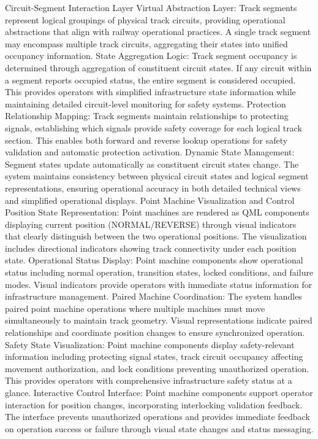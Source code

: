 Circuit-Segment Interaction Layer
Virtual Abstraction Layer: Track segments represent logical groupings of physical track circuits, providing operational abstractions that align with railway operational practices. A single track segment may encompass multiple track circuits, aggregating their states into unified occupancy information.
State Aggregation Logic: Track segment occupancy is determined through aggregation of constituent circuit states. If any circuit within a segment reports occupied status, the entire segment is considered occupied. This provides operators with simplified infrastructure state information while maintaining detailed circuit-level monitoring for safety systems.
Protection Relationship Mapping: Track segments maintain relationships to protecting signals, establishing which signals provide safety coverage for each logical track section. This enables both forward and reverse lookup operations for safety validation and automatic protection activation.
Dynamic State Management: Segment states update automatically as constituent circuit states change. The system maintains consistency between physical circuit states and logical segment representations, ensuring operational accuracy in both detailed technical views and simplified operational displays.
Point Machine Visualization and Control
Position State Representation: Point machines are rendered as QML components displaying current position (NORMAL/REVERSE) through visual indicators that clearly distinguish between the two operational positions. The visualization includes directional indicators showing track connectivity under each position state.
Operational Status Display: Point machine components show operational status including normal operation, transition states, locked conditions, and failure modes. Visual indicators provide operators with immediate status information for infrastructure management.
Paired Machine Coordination: The system handles paired point machine operations where multiple machines must move simultaneously to maintain track geometry. Visual representations indicate paired relationships and coordinate position changes to ensure synchronized operation.
Safety State Visualization: Point machine components display safety-relevant information including protecting signal states, track circuit occupancy affecting movement authorization, and lock conditions preventing unauthorized operation. This provides operators with comprehensive infrastructure safety status at a glance.
Interactive Control Interface: Point machine components support operator interaction for position changes, incorporating interlocking validation feedback. The interface prevents unauthorized operations and provides immediate feedback on operation success or failure through visual state changes and status messaging.